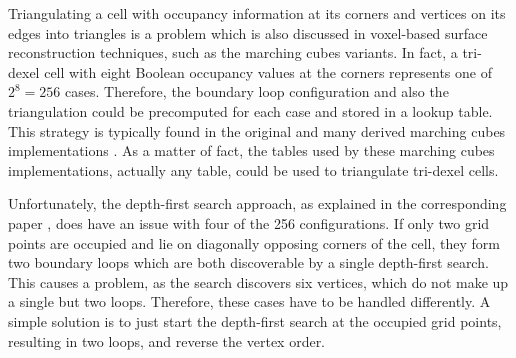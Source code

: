 Triangulating a cell with occupancy information at its corners and vertices on its edges into triangles is a problem which is also discussed in voxel-based surface reconstruction techniques, such as the marching cubes variants.
In fact, a tri-dexel cell with eight Boolean occupancy values at the corners represents one of $2^8 = 256$ cases.
Therefore, the boundary loop configuration and also the triangulation could be precomputed for each case and stored in a lookup table.
This strategy is typically found in the original and many derived marching cubes implementations \cite{marching_cubes}.
As a matter of fact, the tables used by these marching cubes implementations, actually any table, could be used to triangulate tri-dexel cells.

Unfortunately, the depth-first search approach, as explained in the corresponding paper \cite{tridexel_reconstruction}, does have an issue with four of the 256 configurations.
If only two grid points are occupied and lie on diagonally opposing corners of the cell, they form two boundary loops which are both discoverable by a single depth-first search.
This causes a problem, as the search discovers six vertices, which do not make up a single but two loops.
Therefore, these cases have to be handled differently.
A simple solution is to just start the depth-first search at the occupied grid points, resulting in two loops, and reverse the vertex order.

